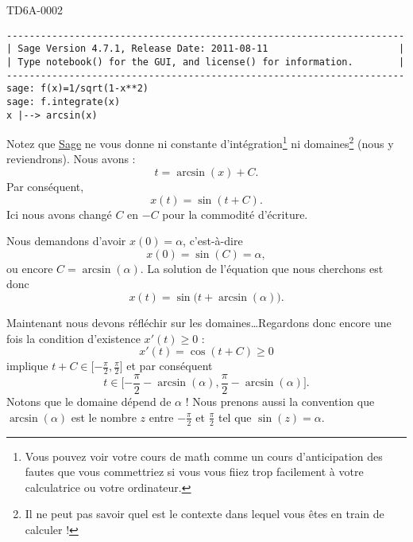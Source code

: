 \begin{corrige}{TD6A-0002}
\begin{enumerate}
            \begin{verbatim}
----------------------------------------------------------------------
| Sage Version 4.7.1, Release Date: 2011-08-11                       |
| Type notebook() for the GUI, and license() for information.        |
----------------------------------------------------------------------
sage: f(x)=1/sqrt(1-x**2)
sage: f.integrate(x)
x |--> arcsin(x)
            \end{verbatim}
            Notez que \href{http://sagemath.org}{Sage} ne vous donne ni constante d'intégration\footnote{Vous pouvez voir votre cours de math comme un cours d'anticipation des fautes que vous commettriez si vous vous fiiez trop facilement à votre calculatrice ou votre ordinateur.} ni domaines\footnote{Il ne peut pas savoir quel est le contexte dans lequel vous êtes en train de calculer !} (nous y reviendrons). Nous avons :
            \begin{equation}
                t=\arcsin(x)+C.
            \end{equation}
            Par conséquent,
            \begin{equation}
                x(t)=\sin(t+C).
            \end{equation}
            Ici nous avons changé \( C\) en \( -C\) pour la commodité d'écriture.

            Nous demandons d'avoir \( x(0)=\alpha\), c'est-à-dire
            \begin{equation}
                x(0)=\sin(C)=\alpha,
            \end{equation}
            ou encore \( C=\arcsin(\alpha)\). La solution de l'équation que nous cherchons est donc
            \begin{equation}
                x(t)=\sin\big(t+\arcsin(\alpha)\big).
            \end{equation}
            
            Maintenant nous devons réfléchir sur les domaines\ldots Regardons donc encore une fois la condition d'existence \( x'(t)\geq 0\) :
            \begin{equation}
                x'(t)=\cos(t+C)\geq 0
            \end{equation}
            implique \( t+C\in\mathopen[ -\frac{ \pi }{2} , \frac{ \pi }{2} \mathclose]\) et par conséquent
            \begin{equation}
                t\in\mathopen[ -\frac{ \pi }{2}-\arcsin(\alpha) , \frac{ \pi }{ 2 }-\arcsin(\alpha) \mathclose].
            \end{equation}
            Notons que le domaine dépend de \( \alpha\) ! Nous prenons aussi la convention que \( \arcsin(\alpha)\) est le nombre \( z\) entre \( -\frac{ \pi }{2}\) et \( \frac{ \pi }{2}\) tel que \( \sin(z)=\alpha\).
            


\end{enumerate}
\end{corrige}
